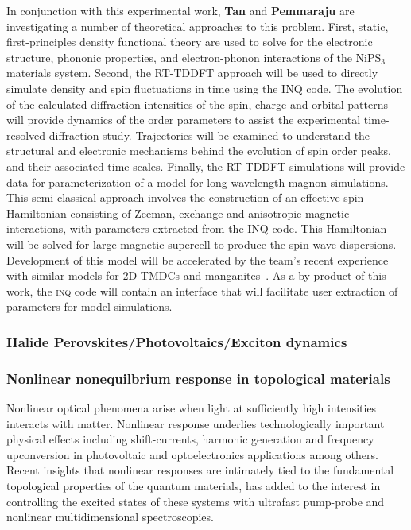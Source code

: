In conjunction with this experimental work, {\bf Tan} and {\bf Pemmaraju} are investigating a number of theoretical approaches to this problem.
First, static, first-principles density functional theory are used to solve for the electronic structure, phononic properties, and electron-phonon interactions of the \(\mathrm{NiPS_3}\) materials system. 
Second, the RT-TDDFT approach will be used to directly simulate density and spin fluctuations in time using the INQ code.
The evolution of the calculated diffraction intensities of the spin, charge and orbital patterns will provide dynamics of the order parameters to assist the experimental time-resolved diffraction study.
Trajectories will be examined to understand the structural and electronic mechanisms behind the evolution of spin order peaks, and their associated time scales. 
Finally, the RT-TDDFT simulations will provide data for parameterization of a model for long-wavelength magnon simulations. 
This semi-classical approach involves the construction of an effective spin Hamiltonian consisting of Zeeman, exchange and anisotropic magnetic interactions, with parameters extracted from the INQ code. 
This Hamiltonian will be solved for large magnetic supercell to produce the spin-wave dispersions. 
Development of this model will be accelerated by the team’s recent experience with similar models for 2D TMDCs and manganites~\cite{Siddiqui2020, Rajpurohit2020}. 
As a by-product of this work, the \textsc{inq} code will contain an interface that will facilitate user extraction of parameters for model simulations.

\subsubsection{Halide Perovskites/Photovoltaics/Exciton dynamics}

\subsubsection{Nonlinear nonequilbrium response in topological materials}

Nonlinear optical phenomena arise when light at sufficiently high intensities interacts with matter. Nonlinear response underlies technologically important physical effects including shift-currents, harmonic generation and frequency upconversion in photovoltaic and optoelectronics applications among others.  Recent insights that nonlinear responses are intimately tied to the fundamental topological properties of the quantum materials, has added to the interest in controlling the excited states of these systems with  ultrafast pump-probe and nonlinear multidimensional spectroscopies.


